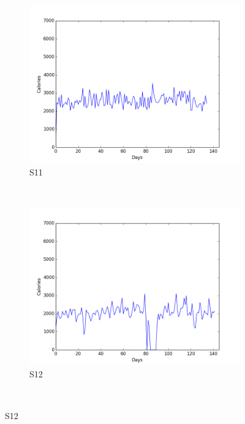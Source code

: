 \documentclass[12pt]{article} %
\begin{document}
\begin{figure}[H]
    \centering
    \begin{subfigure}[b]{0.30\textwidth}
        \includegraphics[width=\textwidth]{img/graphs/11-calories-1}
        \caption{S11}
        \label{fig:s11cal}
    \end{subfigure}
    ~ %
    \begin{subfigure}[b]{0.30\textwidth}
        \includegraphics[width=\textwidth]{img/graphs/12-calories-1}
        \caption{S12}
        \label{fig:s12cal}
    \end{subfigure}
    ~ %

\end{figure}
\end{document}
